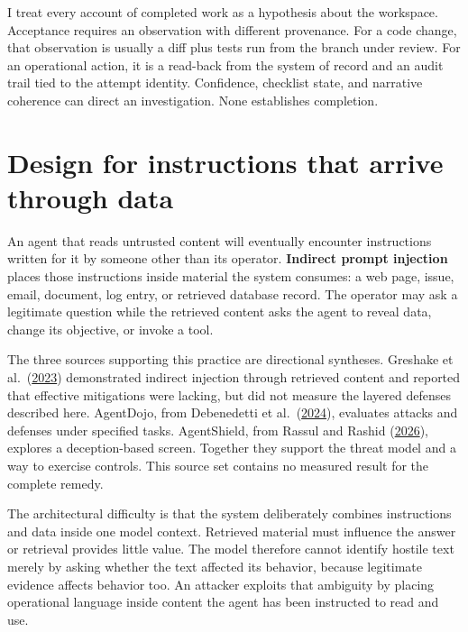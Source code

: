 I treat every account of completed work as a hypothesis about the workspace. Acceptance requires an observation with different provenance. For a code change, that observation is usually a diff plus tests run from the branch under review. For an operational action, it is a read-back from the system of record and an audit trail tied to the attempt identity. Confidence, checklist state, and narrative coherence can direct an investigation. None establishes completion.

\hypertarget{design-for-instructions-that-arrive-through-data}{%
\section{Design for instructions that arrive through data}\label{design-for-instructions-that-arrive-through-data}}

An agent that reads untrusted content will eventually encounter instructions written for it by someone other than its operator. \textbf{Indirect prompt injection} places those instructions inside material the system consumes: a web page, issue, email, document, log entry, or retrieved database record. The operator may ask a legitimate question while the retrieved content asks the agent to reveal data, change its objective, or invoke a tool.

The three sources supporting this practice are directional syntheses. Greshake et al.~(\href{https://arxiv.org/abs/2302.12173}{2023}) demonstrated indirect injection through retrieved content and reported that effective mitigations were lacking, but did not measure the layered defenses described here. AgentDojo, from Debenedetti et al.~(\href{https://arxiv.org/abs/2406.13352}{2024}), evaluates attacks and defenses under specified tasks. AgentShield, from Rassul and Rashid (\href{https://arxiv.org/abs/2605.11026}{2026}), explores a deception-based screen. Together they support the threat model and a way to exercise controls. This source set contains no measured result for the complete remedy.

The architectural difficulty is that the system deliberately combines instructions and data inside one model context. Retrieved material must influence the answer or retrieval provides little value. The model therefore cannot identify hostile text merely by asking whether the text affected its behavior, because legitimate evidence affects behavior too. An attacker exploits that ambiguity by placing operational language inside content the agent has been instructed to read and use.

